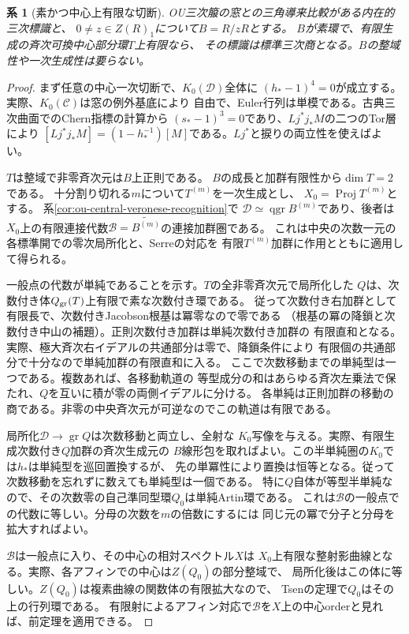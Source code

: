 \documentclass[11pt,a4paper]{ltjsarticle}
\newtheorem{corollary}[theorem]{系}
\theoremstyle{definition}
\newcommand{\qgr}{\operatorname{qgr}}
\begin{document}
\begin{corollary}[素かつ中心上有限な切断]
\label{cor:ou-prime-finite-central-slice}
OU三次箙の窓との三角導来比較がある内在的三次標識と、
$0\ne z\in Z(R)_1$について$B=R/zR$とする。
$B$が素環で、有限生成の斉次可換中心部分環$T$上有限なら、
その標識は標準三次商となる。$B$の整域性や一次生成性は要らない。
\end{corollary}
\begin{proof}
まず任意の中心一次切断で、$K_0(\mathcal D)$全体に
$(h_*-1)^4=0$が成立する。実際、$K_0(\mathcal C)$は窓の例外基底により
自由で、Euler行列は単模である。古典三次曲面でのChern指標の計算から
$(s_*-1)^3=0$であり、$Lj^*j_*M$の二つのTor層により
$[Lj^*j_*M]=(1-h_*^{-1})[M]$である。$Lj^*$と捩りの両立性を使えばよい。

$T$は整域で非零斉次元は$B$上正則である。
$B$の成長と加群有限性から$\dim T=2$である。
十分割り切れる$m$について$T^{(m)}$を一次生成とし、
$X_0=\operatorname{Proj}T^{(m)}$とする。
系\ref{cor:ou-central-veronese-recognition}で
$\mathcal D\simeq\qgr B^{(m)}$であり、後者は
$X_0$上の有限連接代数$\mathcal B=\widetilde{B^{(m)}}$の連接加群圏である。
これは中央の次数一元の各標準開での零次局所化と、Serreの対応を
有限$T^{(m)}$加群に作用とともに適用して得られる。

一般点の代数が単純であることを示す。$T$の全非零斉次元で局所化した
$Q$は、次数付き体$Q_{\rm gr}(T)$上有限で素な次数付き環である。
従って次数付き右加群として有限長で、次数付きJacobson根基は冪零なので零である
（根基の冪の降鎖と次数付き中山の補題）。正則次数付き加群は単純次数付き加群の
有限直和となる。実際、極大斉次右イデアルの共通部分は零で、降鎖条件により
有限個の共通部分で十分なので単純加群の有限直和に入る。
ここで次数移動までの単純型は一つである。複数あれば、各移動軌道の
等型成分の和はあらゆる斉次左乗法で保たれ、$Q$を互いに積が零の両側イデアルに分ける。
各単純は正則加群の移動の商である。非零の中央斉次元が可逆なのでこの軌道は有限である。

局所化$\mathcal D\to\operatorname{gr}Q$は次数移動と両立し、全射な
$K_0$写像を与える。実際、有限生成次数付き$Q$加群の斉次生成元の
$B$線形包を取ればよい。この半単純圏の$K_0$では$h_*$は単純型を巡回置換するが、
先の単冪性により置換は恒等となる。従って次数移動を忘れずに数えても単純型は一個である。
特に$Q$自体が等型半単純なので、その次数零の自己準同型環$Q_0$は単純Artin環である。
これは$\mathcal B$の一般点での代数に等しい。分母の次数を$m$の倍数にするには
同じ元の冪で分子と分母を拡大すればよい。

$\mathcal B$は一般点に入り、その中心の相対スペクトル$X$は
$X_0$上有限な整射影曲線となる。実際、各アフィンでの中心は$Z(Q_0)$の部分整域で、
局所化後はこの体に等しい。$Z(Q_0)$は複素曲線の関数体の有限拡大なので、
Tsenの定理で$Q_0$はその上の行列環である。
有限射によるアフィン対応で$\mathcal B$を$X$上の中心orderと見れば、前定理を適用できる。
\end{proof}
\end{document}
